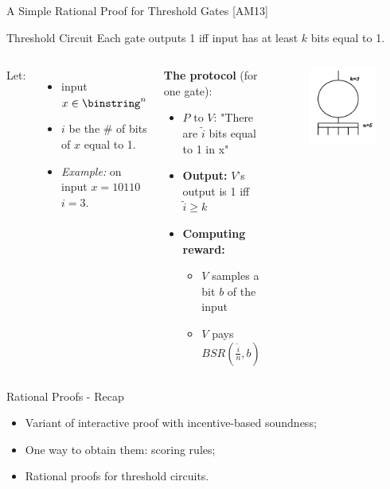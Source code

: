 \begin{frame}{A Simple Rational Proof for Threshold Gates [AM13]} 
\begin{block}{Threshold Circuit}
	Each gate outputs 1 iff input has at least $k$ bits equal to 1.
\end{block}
\pause
\noindent
\begin{columns}
	Let:
	\begin{itemize}[<+- | alert@+>]
		\item input $x \in \binstring^n$
		\item $i$ be the  \# of bits of $x$ equal to 1.
		\item \emph{Example:} on input $x=10110$ $i=3$. 
	\end{itemize}
	\pause
	
	\begin{block}{\textbf{The protocol}  (for one gate):}
		
		\begin{itemize}[<+- | alert@+>]
			\item $P$ to $V$: "There are $\tilde{i}$ bits equal to 1 in x"
			\item \textbf{Output:} $V$'s output is 1 iff $\tilde{i} \geq k$
			\item \textbf{Computing reward:}
			\begin{itemize}
				\item $V$ samples a bit $b$ of the input
				\item $V$ pays $BSR(\frac{\tilde{i}}{n}, b)$
			\end{itemize}
		\end{itemize}
	\end{block}
	\begin{figure}
		\includegraphics[scale=0.8]{pics/threshold-circ.png}
		
	\end{figure}
\end{columns}
\end{frame}


\begin{frame}{Rational Proofs - Recap}
	\begin{itemize}[<+- | alert@+>]
		\item Variant of interactive proof with incentive-based soundness;
		\item One way to obtain them: scoring rules;
		\item Rational proofs for threshold circuits.
	\end{itemize}
\end{frame}